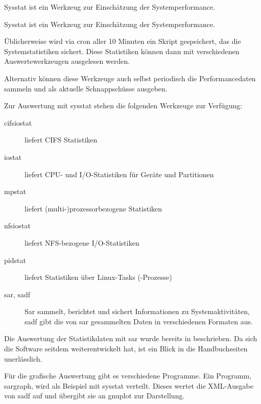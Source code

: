 \begin{abstractsec}
  Sysstat ist ein Werkzeug zur Einschätzung der Systemperformance.
\end{abstractsec}
\begin{normaltext}
  Sysstat ist ein Werkzeug zur Einschätzung der Systemperformance.

  Üblicherweise wird via cron aller 10 Minuten ein Skript gespeichert, das die
  Systemstatistiken sichert. Diese Statistiken können dann mit verschiedenen
  Auswertewerkzeugen ausgelesen werden.

  Alternativ können diese Werkzeuge auch selbst periodisch die
  Performancedaten sammeln und als aktuelle Schnappschüsse ausgeben.

  Zur Auswertung mit sysstat stehen die folgenden Werkzeuge zur Verfügung:
  \begin{description}
    \item[cifsiostat] liefert CIFS Statistiken
    \item[iostat] liefert CPU- und I/O-Statistiken für Geräte und Partitionen
    \item[mpstat] liefert (multi-)prozessorbezogene Statistiken
    \item[nfsiostat] liefert NFS-bezogene I/O-Statistiken
    \item[pidstat] liefert Statistiken über Linux-Tasks (-Prozesse)
    \item[sar, sadf] Sar sammelt, berichtet und sichert Informationen zu
      Systemaktivitäten, sadf gibt die von sar gesammelten Daten in
      verschiedenen Formaten aus.
  \end{description}

  Die Auswertung der Statistikdaten mit sar wurde bereits in
  \cite{Loukides:1996:SPT:547780} beschrieben. Da sich die Software seitdem
  weiterentwickelt hat, ist ein Blick in die Handbuchseiten unerlässlich.

  Für die grafische Auswertung gibt es verschiedene Programme. Ein
  Programm, sargraph, wird als Beispiel mit sysstat verteilt. Dieses wertet
  die XML-Ausgabe von sadf auf und übergibt sie an gnuplot zur Darstellung.
\end{normaltext}

